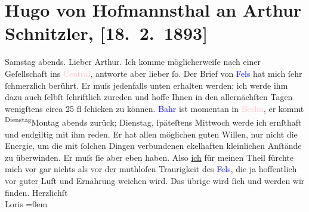 

               \section[Hugo von Hofmannsthal an Arthur Schnitzler, {[}18. 2. 1893{]}]{ Hugo von Hofmannsthal an Arthur Schnitzler, {[}18. 2. 1893{]}}\nopagebreak{}\rehead{ }\normalsize\beginnumbering{} \toendnotes[C]{\smallbreak\pagebreak[2]} 
\pstart
           \raggedleft{}{\pb}Samstag abends.\pend
           \pstart\center{}Lieber Arthur.\pend\pstart
           Ich komme möglicherweiſe nach einer Geſellschaft ins \textcolor{pink}{Central}{}\ledrightnote{\textcolor{pink}{Café Central}}, antworte aber lieber ſo. Der Brief von \textcolor{blue}{Fels}{}\ledrightnote{\textcolor{blue}{Friedrich Michael Fels}} hat mich ſehr ſchmerzlich berührt. Er muſs
                    jedenfalls unten erhalten werden; ich werde ihm dazu auch ſelbſt ſchriftlich
                    zureden und hoffe Ihnen in den allernächſten Tagen wenigſtens circa 25 fl
                    ſchicken zu können. \textcolor{blue}{Bahr}{}\ledrightnote{\textcolor{blue}{Hermann Bahr}} ist momentan in \textcolor{pink}{Berlin}{}\ledrightnote{\textcolor{pink}{Berlin}}, {\pb}er kommt \substVorne{}\textsuperscript{Dienstag}{\allowbreak}\substDazwischen{}Montag\substHinten{} abends zurück; Dienstag, ſpäteſtens Mittwoch werde ich ernſthaft und
                    endgiltig mit ihm reden. Er hat allen möglichen guten Willen, nur nicht die
                    Energie, um die mit ſolchen Dingen verbundenen ekelhaften kleinlichen Anſtände
                    zu überwinden. Er muſs ſie aber eben haben. Also \uline{ich} für meinen Theil fürchte mich vor gar nichts als vor der muthloſen
                        {\pb}Traurigkeit des \textcolor{blue}{Fels}{}\ledrightnote{\textcolor{blue}{Friedrich Michael Fels}}, die ja hoffentlich vor guter Luft und
                    Ernährung weichen wird. Das übrige wird ſich und werden wir finden.\pend
           \pstart
           Herzlichſt{\\[\baselineskip]}\spacefill\mbox{Loris}\pend
           \leftskip=0em{}\endnumbering{}  
      